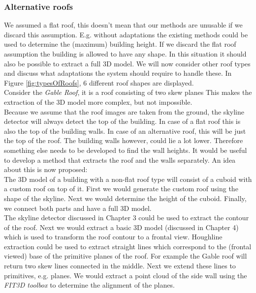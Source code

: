\subsubsection{Alternative roofs}
We assumed a flat roof, this doesn't mean that our methods are unusable if
we discard this assumption.
E.g. without adaptations the existing methods could be used to determine the (maximum)
building height. 
If we discard the flat roof assumption the building is allowed to have any
shape. In this situation it should also be possible to extract a
full 3D model.  We will now consider other roof types and discuss what
adaptations the system should require to handle these.  In Figure
\ref{fig:typesOfRoofs}, 6 different roof shapes are displayed.\\

Consider the \emph{Gable Roof}, it is a roof consisting of two skew planes
This makes the extraction of the 3D model more complex, but not impossible. \\
Because we assume that the roof images are taken from the ground, the skyline
detector will always detect the top of the building. In case of a flat roof
this is also the top of the building walls. In case of an
alternative roof, this will be just the top of the roof. The building walls
however, could lie a lot lower. Therefore something else needs to be developed to find the wall
heights. It would be useful to develop a method that extracts the roof
and the walls separately. An idea about this is now proposed:\\

The 3D model of a building with a non-flat roof type will consist of a cuboid 
with a custom roof on top of it.  First we would generate the custom roof 
using the shape of the skyline.  Next we would determine the height of the
cuboid. Finally, we connect both parts and have a full 3D model.\\

The skyline detector discussed in Chapter 3 could be used to extract the contour
of the roof. Next we would extract a basic 3D model (discussed in Chapter 4) which
is used to transform the roof contour to a frontal view.  Houghline
extraction could be used to extract straight lines which correspond to the
(frontal viewed) base of the primitive planes of the roof.  For example the Gable roof will return two
skew lines connected in the middle. Next we extend these lines to primitives,
e.g. planes.  We would extract a point cloud of the side wall using the \emph{FIT3D toolbox\cite{FIT3D}} 
to determine the alignment of the planes.\\

